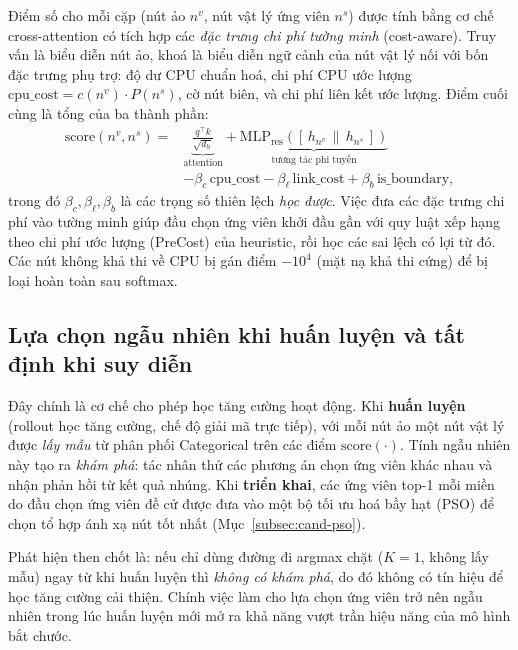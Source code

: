 \documentclass[../DoAn.tex]{subfiles}
\begin{document}
Điểm số cho mỗi cặp (nút ảo $n^v$, nút vật lý ứng viên $n^s$) được tính bằng cơ chế cross-attention có tích hợp các \textit{đặc trưng chi phí tường minh} (cost-aware). Truy vấn là biểu diễn nút ảo, khoá là biểu diễn ngữ cảnh của nút vật lý nối với bốn đặc trưng phụ trợ: độ dư CPU chuẩn hoá, chi phí CPU ước lượng $\mathrm{cpu\_cost}=c(n^v)\cdot P(n^s)$, cờ nút biên, và chi phí liên kết ước lượng. Điểm cuối cùng là tổng của ba thành phần:
\begin{equation}
\begin{split}
    \mathrm{score}(n^v, n^s) = {} & \underbrace{\frac{q^\top k}{\sqrt{d_h}}}_{\text{attention}} + \underbrace{\mathrm{MLP}_{\text{res}}([\,h_{n^v}\,\|\,h_{n^s}\,])}_{\text{tương tác phi tuyến}} \\
    & - \beta_c\,\mathrm{cpu\_cost} - \beta_\ell\,\mathrm{link\_cost} + \beta_b\,\mathrm{is\_boundary},
\end{split}
    \label{eq:cand-score}
\end{equation}
trong đó $\beta_c, \beta_\ell, \beta_b$ là các trọng số thiên lệch \textit{học được}. Việc đưa các đặc trưng chi phí vào tường minh giúp đầu chọn ứng viên khởi đầu gần với quy luật xếp hạng theo chi phí ước lượng (PreCost) của heuristic, rồi học các sai lệch có lợi từ đó. Các nút không khả thi về CPU bị gán điểm $-10^4$ (mặt nạ khả thi cứng) để bị loại hoàn toàn sau softmax.

\subsection{Lựa chọn ngẫu nhiên khi huấn luyện và tất định khi suy diễn}
\label{subsec:cand-sampling}

Đây chính là cơ chế cho phép học tăng cường hoạt động. Khi \textbf{huấn luyện} (rollout học tăng cường, chế độ giải mã trực tiếp), với mỗi nút ảo một nút vật lý được \textit{lấy mẫu} từ phân phối Categorical trên các điểm $\mathrm{score}(\cdot)$. Tính ngẫu nhiên này tạo ra \textit{khám phá}: tác nhân thử các phương án chọn ứng viên khác nhau và nhận phản hồi từ kết quả nhúng. Khi \textbf{triển khai}, các ứng viên top-1 mỗi miền do đầu chọn ứng viên đề cử được đưa vào một bộ tối ưu hoá bầy hạt (PSO) để chọn tổ hợp ánh xạ nút tốt nhất (Mục~\ref{subsec:cand-pso}).

Phát hiện then chốt là: nếu chỉ dùng đường đi argmax chặt ($K=1$, không lấy mẫu) ngay từ khi huấn luyện thì \textit{không có khám phá}, do đó không có tín hiệu để học tăng cường cải thiện. Chính việc làm cho lựa chọn ứng viên trở nên ngẫu nhiên trong lúc huấn luyện mới mở ra khả năng vượt trần hiệu năng của mô hình bắt chước.
\end{document}
